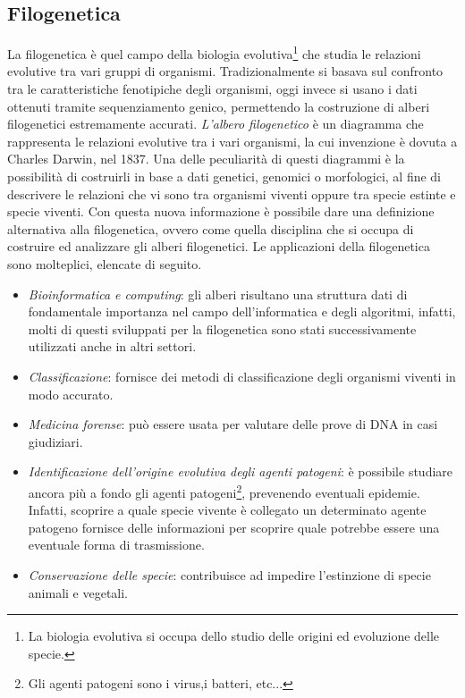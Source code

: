 \subsection{Filogenetica}
La filogenetica è quel campo della biologia evolutiva\footnote{La biologia evolutiva si occupa dello studio delle origini ed evoluzione delle specie.} che studia le relazioni evolutive tra vari gruppi di organismi.
Tradizionalmente si basava sul confronto tra le caratteristiche fenotipiche degli organismi, oggi invece si usano i dati ottenuti tramite sequenziamento genico, permettendo la costruzione di alberi filogenetici estremamente accurati.
\newline
\textit{L'albero filogenetico} è un diagramma che rappresenta le relazioni evolutive tra i vari organismi, la cui invenzione è dovuta a Charles Darwin, nel 1837. Una delle peculiarità di questi diagrammi è la possibilità di costruirli in base a dati genetici, genomici o morfologici, al fine di descrivere le relazioni che vi sono tra organismi viventi oppure tra specie estinte e specie viventi. Con questa nuova informazione è possibile dare una definizione alternativa alla filogenetica, ovvero come quella disciplina che si occupa di costruire ed analizzare gli alberi filogenetici.
\newline
Le applicazioni della filogenetica sono molteplici, elencate di seguito.
\begin{itemize}
	\item \textit{Bioinformatica e computing}: gli alberi risultano una struttura dati di fondamentale importanza nel campo dell'informatica e degli algoritmi, infatti, molti di questi sviluppati per la filogenetica sono stati successivamente utilizzati anche in altri settori.
	\item \textit{Classificazione}: fornisce dei metodi di classificazione degli organismi viventi in modo accurato.
	\item \textit{Medicina forense}: può essere usata per valutare delle prove di DNA in casi giudiziari.
	\item \textit{Identificazione dell'origine evolutiva degli agenti patogeni}: è possibile studiare ancora più a fondo gli agenti patogeni\footnote{Gli agenti patogeni sono i virus,i  batteri, etc...}, prevenendo eventuali epidemie. Infatti, scoprire a quale specie vivente è collegato un determinato agente patogeno fornisce delle informazioni per scoprire quale potrebbe essere una eventuale forma di trasmissione.
	\item \textit{Conservazione delle specie}: contribuisce ad impedire l'estinzione di specie animali e vegetali.
\end{itemize}

